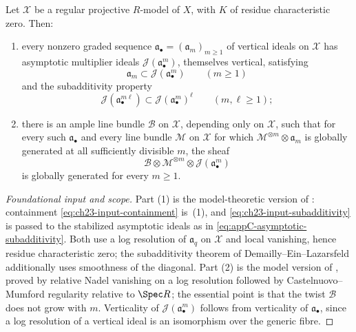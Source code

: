 \begin{theorem}
\label{thm:ch23-uniform-generation-input}
Let \(\mathcal X\) be a regular projective \(R\)-model of \(X\), with
\(K\) of residue characteristic zero.  Then:
\begin{enumerate}
\item every nonzero graded sequence
\(\mathfrak a_\bullet=(\mathfrak a_m)_{m\geq1}\) of vertical ideals on
\(\mathcal X\) has asymptotic multiplier ideals
\(\mathcal J(\mathfrak a_\bullet^m)\), themselves vertical, satisfying
\begin{equation}\label{eq:ch23-input-containment}
 \mathfrak a_m\subset\mathcal J(\mathfrak a_\bullet^m)
 \qquad(m\geq1)
\end{equation}
and the subadditivity property
\begin{equation}\label{eq:ch23-input-subadditivity}
 \mathcal J(\mathfrak a_\bullet^{m\ell})
   \subset\mathcal J(\mathfrak a_\bullet^m)^{\ell}
 \qquad(m,\ell\geq1);
\end{equation}
\item there is an ample line bundle \(\mathcal B\) on \(\mathcal X\),
depending only on \(\mathcal X\), such that for every such
\(\mathfrak a_\bullet\) and every line bundle \(\mathcal M\) on
\(\mathcal X\) for which \(\mathcal M^{\otimes m}\otimes\mathfrak a_m\) is
globally generated at all sufficiently divisible \(m\), the sheaf
\begin{equation}\label{eq:ch23-input-uniform-generation}
       \mathcal B\otimes\mathcal M^{\otimes m}\otimes
       \mathcal J(\mathfrak a_\bullet^m)
\end{equation}
is globally generated for every \(m\geq1\).
\end{enumerate}
\end{theorem}

\begin{proof}[Foundational input and scope]
Part (1) is the model-theoretic version of
: containment
\eqref{eq:ch23-input-containment} is
\,(1), and
\eqref{eq:ch23-input-subadditivity} is
 passed to the stabilized
asymptotic ideals as in
\eqref{eq:appC-asymptotic-subadditivity}.  Both use a log resolution of
\(\mathfrak a_q\) on \(\mathcal X\) and local vanishing, hence residue
characteristic zero; the subadditivity theorem of Demailly--Ein--Lazarsfeld
\cite[Theorem~2.3]{DEL00} additionally uses smoothness of the diagonal.
Part (2) is the model version of ,
proved by relative Nadel vanishing on a log resolution followed by
Castelnuovo--Mumford regularity relative to \(\Spec R\); the essential point
is that the twist \(\mathcal B\) does not grow with \(m\).  Verticality of
\(\mathcal J(\mathfrak a_\bullet^m)\) follows from verticality of
\(\mathfrak a_\bullet\), since a log resolution of a vertical ideal is an
isomorphism over the generic fibre.
\end{proof}

